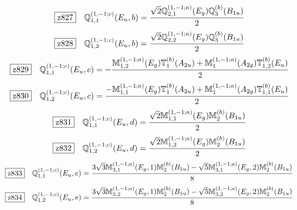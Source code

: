 \documentclass[fleqn,10pt,landscape]{jsarticle}
\begin{document}
\begin{dmath*}
\hspace*{3mm}\fbox{z827}\quad \mathbb{Q}_{1,1}^{(1,-1;c)}(E_{u},b)=\frac{\sqrt{2} \mathbb{Q}_{2,1}^{(1,-1;a)}(E_{g}) \mathbb{Q}_{3}^{(b)}(B_{1u})}{2}
\end{dmath*}
\begin{dmath*}
\hspace*{3mm}\fbox{z828}\quad \mathbb{Q}_{1,2}^{(1,-1;c)}(E_{u},b)=\frac{\sqrt{2} \mathbb{Q}_{2,2}^{(1,-1;a)}(E_{g}) \mathbb{Q}_{3}^{(b)}(B_{1u})}{2}
\end{dmath*}
\begin{dmath*}
\hspace*{3mm}\fbox{z829}\quad \mathbb{Q}_{1,1}^{(1,-1;c)}(E_{u},c)=- \frac{\mathbb{M}_{1,2}^{(1,-1;a)}(E_{g}) \mathbb{T}_{1}^{(b)}(A_{2u}) + \mathbb{M}_{1}^{(1,-1;a)}(A_{2g}) \mathbb{T}_{1,2}^{(b)}(E_{u})}{2}
\end{dmath*}
\begin{dmath*}
\hspace*{3mm}\fbox{z830}\quad \mathbb{Q}_{1,2}^{(1,-1;c)}(E_{u},c)=\frac{- \mathbb{M}_{1,1}^{(1,-1;a)}(E_{g}) \mathbb{T}_{1}^{(b)}(A_{2u}) + \mathbb{M}_{1}^{(1,-1;a)}(A_{2g}) \mathbb{T}_{1,1}^{(b)}(E_{u})}{2}
\end{dmath*}
\begin{dmath*}
\hspace*{3mm}\fbox{z831}\quad \mathbb{Q}_{1,1}^{(1,-1;c)}(E_{u},d)=\frac{\sqrt{2} \mathbb{M}_{1,1}^{(1,-1;a)}(E_{g}) \mathbb{M}_{2}^{(b)}(B_{1u})}{2}
\end{dmath*}
\begin{dmath*}
\hspace*{3mm}\fbox{z832}\quad \mathbb{Q}_{1,2}^{(1,-1;c)}(E_{u},d)=\frac{\sqrt{2} \mathbb{M}_{1,2}^{(1,-1;a)}(E_{g}) \mathbb{M}_{2}^{(b)}(B_{1u})}{2}
\end{dmath*}
\begin{dmath*}
\hspace*{3mm}\fbox{z833}\quad \mathbb{Q}_{1,1}^{(1,-1;c)}(E_{u},e)=\frac{3 \sqrt{3} \mathbb{M}_{3,1}^{(1,-1;a)}(E_{g},1) \mathbb{M}_{2}^{(b)}(B_{1u}) - \sqrt{5} \mathbb{M}_{3,1}^{(1,-1;a)}(E_{g},2) \mathbb{M}_{2}^{(b)}(B_{1u})}{8}
\end{dmath*}
\begin{dmath*}
\hspace*{3mm}\fbox{z834}\quad \mathbb{Q}_{1,2}^{(1,-1;c)}(E_{u},e)=\frac{3 \sqrt{3} \mathbb{M}_{3,2}^{(1,-1;a)}(E_{g},1) \mathbb{M}_{2}^{(b)}(B_{1u}) - \sqrt{5} \mathbb{M}_{3,2}^{(1,-1;a)}(E_{g},2) \mathbb{M}_{2}^{(b)}(B_{1u})}{8}
\end{dmath*}
\end{document}

